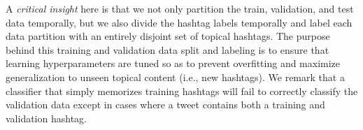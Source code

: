 A \emph{critical insight} here is that we not only partition the train, validation, and test data 
temporally, but we also divide the hashtag labels temporally and label each data partition with
an entirely disjoint set of topical hashtags.
The purpose behind this training and validation data split
and labeling is to ensure that learning hyperparameters are tuned so as
to prevent overfitting and maximize generalization to unseen topical
content (i.e., new hashtags).
We remark that a classifier that simply
memorizes training hashtags will fail to correctly classify the validation data except in 
cases where a tweet contains both a training and validation hashtag.  


